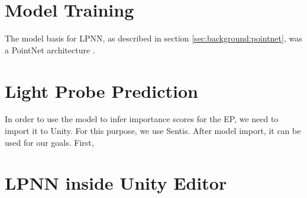 \section{Model Training}
\label{sec:model_training}

The model basis for LPNN, as described in section \ref{sec:background:pointnet}, was a PointNet architecture \parencite{PointNet2017} .

\section{Light Probe Prediction}
In order to use the model to infer importance scores for the EP, we need to import it to Unity. For this purpose, we use Sentis. After model import, it can be used for our goals. First,

\section{LPNN inside Unity Editor}
\label{sec:LPNN_UI}
